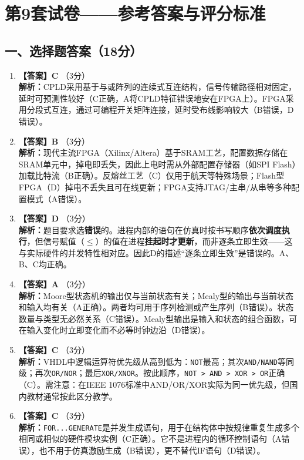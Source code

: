 \chapter{第9套试卷——参考答案与评分标准}

\section{一、选择题答案（18分）}

\begin{enumerate}[label=\arabic*.]

\item \textbf{【答案】C} \quad（3分）\\
\textbf{解析：}CPLD采用基于与或阵列的连续式互连结构，信号传输路径相对固定，延时可预测性较好（C正确，A将CPLD特征错误地安在FPGA上）。FPGA采用分段式互连，通过可编程开关矩阵连接，延时受布线影响较大（B错误，D错误）。

\item \textbf{【答案】B} \quad（3分）\\
\textbf{解析：}现代主流FPGA（Xilinx/Altera）基于SRAM工艺，配置数据存储在SRAM单元中，掉电即丢失，因此上电时需从外部配置存储器（如SPI Flash）加载比特流（B正确）。反熔丝工艺（C）仅用于航天等特殊场景；Flash型FPGA（D）掉电不丢失且可在线更新；FPGA支持JTAG/主串/从串等多种配置模式（A错误）。

\item \textbf{【答案】D} \quad（3分）\\
\textbf{解析：}题目要求选\textbf{错误}的。进程内部的语句在仿真时按书写顺序\textbf{依次调度执行}，但信号赋值（$\le$）的值在进程\textbf{挂起时才更新}，而非逐条立即生效——这与实际硬件的并发特性相对应。因此D的描述“逐条立即生效”是错误的。A、B、C均正确。

\item \textbf{【答案】A} \quad（3分）\\
\textbf{解析：}Moore型状态机的输出仅与当前状态有关；Mealy型的输出与当前状态和输入均有关（A正确）。两者均可用于序列检测或产生序列（B错误）。状态数量与类型无必然关系（C错误）。Mealy型输出是输入和状态的组合函数，可在输入变化时立即变化而不必等时钟边沿（D错误）。

\item \textbf{【答案】C} \quad（3分）\\
\textbf{解析：}VHDL中逻辑运算符优先级从高到低为：\texttt{NOT}最高；其次\texttt{AND/NAND}等同级；再次\texttt{OR/NOR}；最后\texttt{XOR/XNOR}。按此顺序，\texttt{NOT > AND > XOR > OR}正确（C）。需注意：在IEEE 1076标准中AND/OR/XOR实际为同一优先级，但国内教材通常按此区分教学。

\item \textbf{【答案】C} \quad（3分）\\
\textbf{解析：}\texttt{FOR...GENERATE}是并发生成语句，用于在结构体中按规律重复生成多个相同或相似的硬件模块实例（C正确）。它不是进程内的循环控制语句（A错误），也不用于仿真激励生成（B错误），更不替代IF语句（D错误）。

\end{enumerate}

